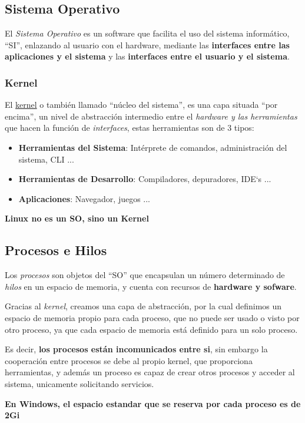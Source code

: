 \subsection{Sistema Operativo}
\noindent El \textit{Sistema Operativo} es un software que facilita el uso del sistema informático, ``SI'', enlazando al usuario con el hardware, mediante las \textbf{interfaces entre las aplicaciones y el sistema} y las \textbf{interfaces entre el usuario y el sistema}.
\subsubsection{Kernel}
\noindent El \underline{kernel} o también llamado ``núcleo del sistema'', es una capa situada ``por encima'', un nivel de abstracción intermedio entre el \textit{hardware y las herramientas} que hacen la función de \textit{interfaces}, estas herramientas son de 3 tipos:
\begin{itemize}
        \item \textbf{Herramientas del Sistema}: Intérprete de comandos, administración del sistema, CLI ...
        \item \textbf{Herramientas de Desarrollo}: Compiladores, depuradores, IDE`s ...
        \item \textbf{Aplicaciones}: Navegador, juegos ...
\end{itemize}
\textbf{Linux no es un SO, sino un Kernel}
\subsection{Procesos e Hilos}
\noindent Los \textit{procesos} son objetos del ``SO'' que encapsulan un número determinado de \textit{hilos} en un espacio de memoria, y cuenta con recursos de \textbf{hardware y sofware}.\par
\noindent Gracias al \textit{kernel}, creamos una capa de abstracción, por la cual definimos un espacio de memoria propio para cada proceso, que no puede ser usado o visto por otro proceso, ya que cada espacio de memoria está definido para un solo proceso. \par \vspace{.5cm}
\noindent Es decir, \textbf{los procesos están incomunicados entre si}, sin embargo la cooperación entre procesos se debe al propio kernel, que proporciona herramientas, y además un proceso es capaz de crear otros procesos y acceder al sistema, unicamente solicitando servicios.
\par \vspace{.5cm} \noindent \textbf{En Windows, el espacio estandar que se reserva por cada proceso es de 2Gi}
